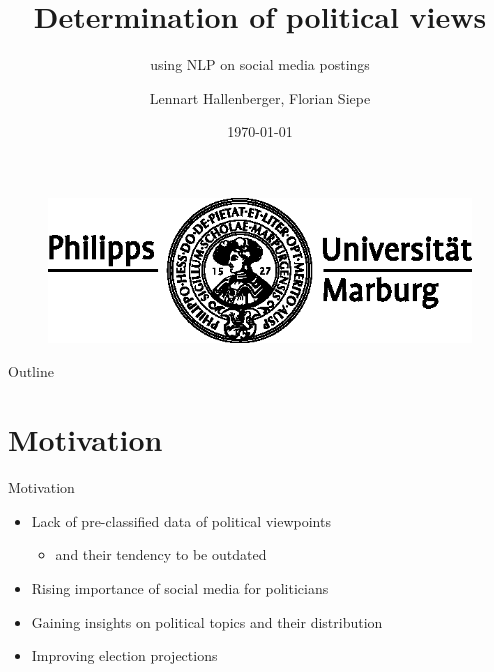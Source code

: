 \documentclass[aspectratio=169,xcolor=dvipsnames]{beamer}
\title[Determination of political views]{Determination of political views}
\subtitle{using NLP on social media postings}
\author[Lennart Hallenberger, Florian Siepe]{Lennart Hallenberger, Florian Siepe}
\institute[] %
{
    Department Mathematics and Computer Science \\
    Philipps University of Marburg
    \vskip 3pt
}
\date{\today} %
\begin{document}
\begin{frame}[plain]
    \titlepage
    \begin{figure}[h]
        \includegraphics[scale=0.5]{images/uni_logo_schwarz.eps}
    \end{figure}
\end{frame}

\begin{frame}{Outline}
    \tableofcontents
\end{frame}
\section{Motivation}

\begin{frame}{Motivation}
    \begin{itemize}
        \item Lack of pre-classified data of political viewpoints
        \begin{itemize}
            \item and their tendency to be outdated
        \end{itemize}
        \item Rising importance of social media for politicians
        \item Gaining insights on political topics and their distribution
        \item Improving election projections
    \end{itemize}
\end{frame}
\end{document}
